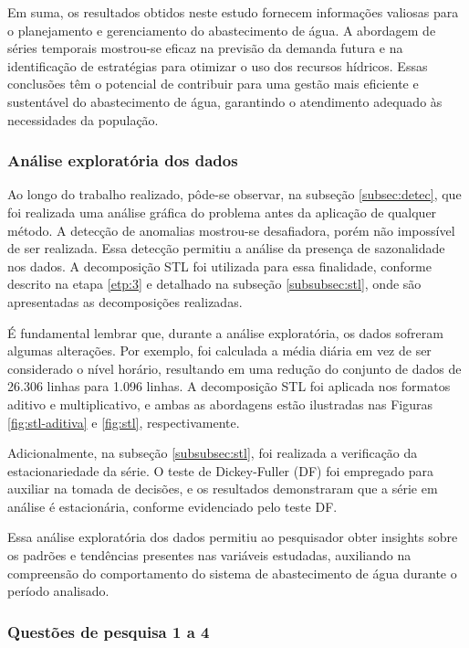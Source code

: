 Em suma, os resultados obtidos neste estudo fornecem informações valiosas para o planejamento e gerenciamento do abastecimento de água. A abordagem de séries temporais mostrou-se eficaz na previsão da demanda futura e na identificação de estratégias para otimizar o uso dos recursos hídricos. Essas conclusões têm o potencial de contribuir para uma gestão mais eficiente e sustentável do abastecimento de água, garantindo o atendimento adequado às necessidades da população.



\subsubsection{An\'alise explorat\'oria dos dados}



Ao longo do trabalho realizado, pôde-se observar, na subseção \ref{subsec:detec}, que foi realizada uma análise gráfica do problema antes da aplicação de qualquer método. A detecção de anomalias mostrou-se desafiadora, porém não impossível de ser realizada. Essa detecção permitiu a análise da presença de sazonalidade nos dados. A decomposição STL foi utilizada para essa finalidade, conforme descrito na etapa \ref{etp:3} e detalhado na subseção \ref{subsubsec:stl}, onde são apresentadas as decomposições realizadas.

É fundamental lembrar que, durante a análise exploratória, os dados sofreram algumas alterações. Por exemplo, foi calculada a média diária em vez de ser considerado o nível horário, resultando em uma redução do conjunto de dados de 26.306 linhas para 1.096 linhas. A decomposição STL foi aplicada nos formatos aditivo e multiplicativo, e ambas as abordagens estão ilustradas nas Figuras \ref{fig:stl-aditiva} e \ref{fig:stl}, respectivamente.

Adicionalmente, na subseção \ref{subsubsec:stl}, foi realizada a verificação da estacionariedade da série. O teste de Dickey-Fuller (DF) foi empregado para auxiliar na tomada de decisões, e os resultados demonstraram que a série em análise é estacionária, conforme evidenciado pelo teste DF.

Essa análise exploratória dos dados permitiu ao pesquisador obter insights sobre os padrões e tendências presentes nas variáveis estudadas, auxiliando na compreensão do comportamento do sistema de abastecimento de água durante o período analisado.



\subsubsection{Quest\~oes de pesquisa 1 a 4}\label{subsubsec:quest-est}


